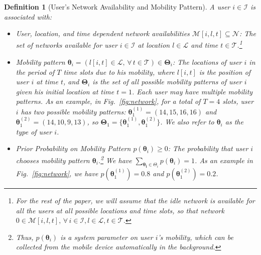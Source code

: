\documentclass[journal]{IEEEtran}
\newcommand{\bs}[1]{\boldsymbol{#1}}
\newtheorem{definition}{Definition}
\begin{document}
	
\begin{definition}[User's Network Availability and Mobility Pattern]  \label{def:attributes_user}
A user $i \in \mathcal{I}$ is associated with:
\begin{itemize}

\item \emph{User, location, and time dependent network availabilities} $\mathcal{M}[i,l,t] \subseteq \mathcal{N}$: The set of networks available for user $i \in \mathcal{I}$ at location $l \in \mathcal{L}$ and time $t \in \mathcal{T}$.\footnote{For the rest of the paper, we will assume that the idle network is available for all the users at all possible locations and time slots, so that network $0 \in \mathcal{M}[i,l,t], \, \forall \, i \in \mathcal{I}, l \in \mathcal{L}, t \in \mathcal{T}$.}

\item \emph{Mobility pattern} $\boldsymbol{\theta}_i = (l[i,t] \in \mathcal{L}, \, \forall \, t \in \mathcal{T}) \in \boldsymbol{\Theta}_i$: The locations of user $i$ in the period of $T$ time slots due to his mobility, where $l[i,t]$ is the position of user $i$ at time $t$, and $\boldsymbol{\Theta}_i$ is the set of all possible mobility patterns of user $i$ given his initial location at time $t = 1$.
  Each user may have \emph{multiple} mobility patterns. As an example, in Fig.~\ref{fig:network}, for a total of $T = 4$ slots, user $i$ has two possible mobility patterns: $\boldsymbol{\theta}_1^{(1)} = (14, 15, 16, 16)$ and $\boldsymbol{\theta}_1^{(2)} = (14, 10, 9, 13)$, so $\boldsymbol{\Theta}_1 = \{ \boldsymbol{\theta}_1^{(1)}, \boldsymbol{\theta}_1^{(2)} \}$. %
  We also refer to $\boldsymbol{\theta}_i$ as the \emph{type} of user $i$.
	
\item \emph{Prior Probability on Mobility Pattern} $p(\boldsymbol{\theta}_i) \geq 0$: The probability that user $i$ chooses mobility pattern $\boldsymbol{\theta}_i$.\footnote{Thus, $p(\boldsymbol{\theta}_i)$ is a system parameter on user $i$'s mobility, which can be collected from the mobile device automatically in the background.} We have $\sum_{\bs{\theta_i} \in \Theta_i} p(\boldsymbol{\theta}_i) = 1$. 
  As an example in Fig.~\ref{fig:network}, we have $p(\boldsymbol{\theta}_1^{(1)}) = 0.8$ and $p(\boldsymbol{\theta}_1^{(2)}) = 0.2$.

\end{itemize}
\end{definition}	
	
\end{document}
